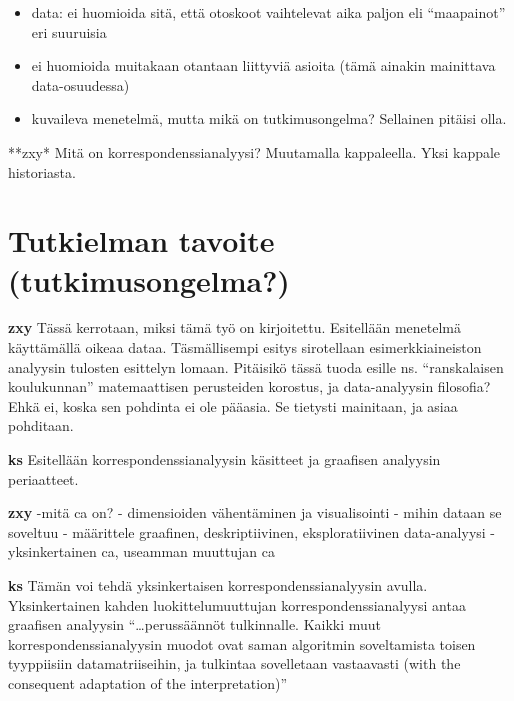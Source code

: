 \documentclass[
  finnish,
]{book}
\begin{document}
\begin{itemize}
\item
  data: ei huomioida sitä, että otoskoot vaihtelevat aika paljon eli ``maapainot'' eri suuruisia
\item
  ei huomioida muitakaan otantaan liittyviä asioita (tämä ainakin mainittava data-osuudessa)
\item
  kuvaileva menetelmä, mutta mikä on tutkimusongelma? Sellainen pitäisi olla.
\end{itemize}

**zxy* Mitä on korrespondenssianalyysi? Muutamalla kappaleella. Yksi kappale historiasta.

\hypertarget{tutkielman-tavoite-tutkimusongelma}{%
\section{Tutkielman tavoite (tutkimusongelma?)}\label{tutkielman-tavoite-tutkimusongelma}}

\textbf{zxy} Tässä kerrotaan, miksi tämä työ on kirjoitettu. Esitellään menetelmä käyttämällä oikeaa dataa. Täsmällisempi esitys sirotellaan esimerkkiaineiston analyysin tulosten esittelyn lomaan. Pitäisikö tässä tuoda esille ns. ``ranskalaisen koulukunnan'' matemaattisen perusteiden korostus, ja data-analyysin filosofia? Ehkä ei, koska sen pohdinta ei ole pääasia. Se tietysti mainitaan, ja asiaa pohditaan.

\textbf{ks} Esitellään korrespondenssianalyysin käsitteet ja graafisen analyysin periaatteet.

\textbf{zxy} -mitä ca on?
- dimensioiden vähentäminen ja visualisointi
- mihin dataan se soveltuu
- määrittele graafinen, deskriptiivinen, eksploratiivinen data-analyysi
- yksinkertainen ca, useamman muuttujan ca

\textbf{ks} Tämän voi tehdä yksinkertaisen korrespondenssianalyysin avulla. Yksinkertainen kahden luokittelumuuttujan
korrespondenssianalyysi antaa graafisen analyysin ``\ldots perussäännöt tulkinnalle. Kaikki muut korrespondenssianalyysin muodot ovat saman algoritmin soveltamista toisen tyyppiisiin datamatriiseihin, ja tulkintaa sovelletaan vastaavasti
(with the consequent adaptation of the interpretation)''\citep[ , s. 437]{RefWorks:doc:5a857a44e4b0ed2d44664d84}
\end{document}
